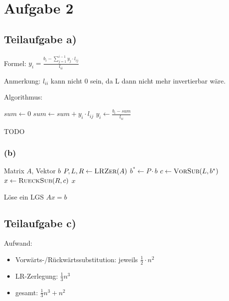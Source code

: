 \section*{Aufgabe 2}
\subsection*{Teilaufgabe a)}
Formel: $y_i = \frac{b_i - \sum_{j=1}^{i-1} y_j \cdot l_{ij}}{l_{ii}} $

Anmerkung: $l_{ii}$ kann nicht $0$ sein, da L dann nicht mehr invertierbar wäre.

Algorithmus:

\begin{algorithm}[H]
    \begin{algorithmic}
			\State $sum \gets 0$
				\State $sum \gets sum + y_i \cdot l_{ij}$
			\EndFor
			\State $y_i \gets \frac{b_i - sum}{l_{ii}}$
		\EndFor
    \end{algorithmic}
\caption{TODO}
\end{algorithm}

\subsubsection*{(b)}
\begin{algorithm}[H]
    \begin{algorithmic}
    \Require Matrix $A$, Vektor $b$
    	\State $P, L, R \gets \Call{LRZer}{A}$
		\State $b^* \gets P \cdot b$
		\State $c \gets \Call{VorSub}{L, b^*}$
		\State $x \gets \Call{RueckSub}{R, c}$
		\State \Return $x$
	\EndProcedure
    \end{algorithmic}
\caption{Löse ein LGS $Ax = b$}
\end{algorithm}

\subsection*{Teilaufgabe c)}
Aufwand:
\begin{itemize}
\item Vorwärts-/Rückwärtssubstitution: jeweils $\frac{1}{2} \cdot n^2$
\item LR-Zerlegung: $\frac{1}{3}n^3$
\item gesamt: $\frac{1}{3}n^3+n^2$
\end{itemize}
